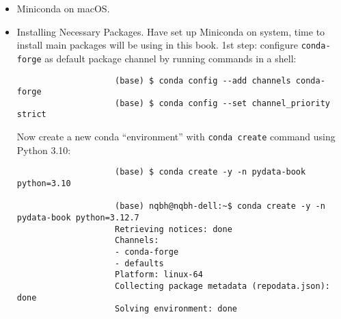 \documentclass{article}
\newtheorem{remark}{Remark}
\begin{document}
\begin{enumerate}
\begin{itemize}
\begin{itemize}
\begin{itemize}
				\begin{remark}
					Some Linux distributions have all required Python packages (although outdated versions, in some cases) in their package managers \& can be installed using a tool like {\tt apt}. Setup described here uses Miniconda, as it's both easily reproducible across distributions \& simpler to upgrade packages to their latest versions.
				\end{remark}
				Will have a choice of where to put Miniconda files. Recommend installing files in default location in home directory; e.g., \verb|/home/$USER/miniconda| (with your username, naturally).
				
				Installer will ask if wish to modify shell scripts to automatically activate Miniconda. Recommend doing this (select ``yes'') as a matter of convenience.
				
				After completing installation, start a new terminal process \& verify that you are picking up new Miniconda installation:
				\begin{verbatim}
					(base) nqbh@nqbh-dell:~/advanced_STEM_beyond/data_science$ python
					Python 3.12.7 | packaged by Anaconda, Inc. | (main, Oct  4 2024, 13:27:36) [GCC 11.2.0] on linux
					Type "help", "copyright", "credits" or "license" for more information.
					>>>
				\end{verbatim}
				To exit Python shell, type {\tt exit()} \& press Enter or press Ctrl-D.
				\item {\sf Miniconda on macOS.}
				\item {\sf Installing Necessary Packages.} Have set up Miniconda on system, time to install main packages will be using in this book. 1st step: configure {\tt conda-forge} as default package channel by running commands in a shell:
				\begin{verbatim}
					(base) $ conda config --add channels conda-forge
					(base) $ conda config --set channel_priority strict
				\end{verbatim}
				Now create a new conda ``environment'' with {\tt conda create} command using Python 3.10:
				\begin{verbatim}
					(base) $ conda create -y -n pydata-book python=3.10
					
					(base) nqbh@nqbh-dell:~$ conda create -y -n pydata-book python=3.12.7
					Retrieving notices: done
					Channels:
					- conda-forge
					- defaults
					Platform: linux-64
					Collecting package metadata (repodata.json): done
					Solving environment: done
					

\end{verbatim}
\end{itemize}
\end{itemize}
\end{itemize}
\end{enumerate}
\end{document}
